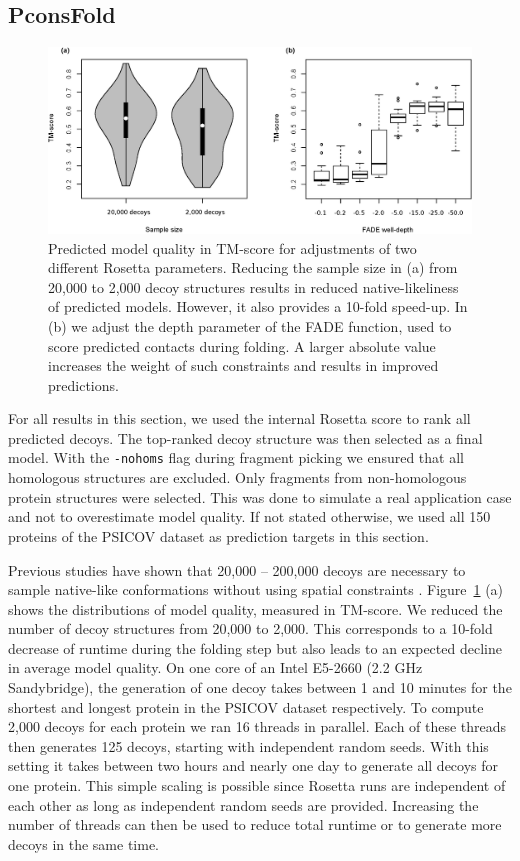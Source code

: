 \documentclass{bioinfo}
\begin{document}
\subsection{PconsFold}
\begin{figure}[!tpb]%
\centerline{\includegraphics[scale=0.7]{figures/rosetta.eps}}
\caption{Predicted model quality in TM-score for adjustments of two
  different Rosetta parameters. Reducing the sample size in (a) from
  20,000 to 2,000 decoy structures results in reduced
  native-likeliness of predicted models. However, it also provides a
  10-fold speed-up. In (b) we adjust the depth parameter of the FADE
  function, used to score predicted contacts during folding. A larger
  absolute value increases the weight of such constraints and results
  in improved predictions.}\label{fig:ros} 
\end{figure}
For all results in this section, we used the internal Rosetta score to
rank all predicted decoys. The top-ranked decoy structure was then
selected as a final model. With the {\tt -nohoms} flag during fragment
picking we ensured that all homologous structures are excluded. Only
fragments from non-homologous protein structures were selected. This
was done to simulate a real application case and not to overestimate
model quality. If not stated otherwise, we used all 150 proteins of
the PSICOV dataset as prediction targets in this section. 

Previous studies have shown that 20,000 -- 200,000 decoys are
necessary to sample native-like conformations without using spatial
constraints \cite[]{Simons10526365}. Figure~\ref{fig:ros} (a) shows the distributions of model quality, measured
in TM-score. We reduced the number of decoy structures from 20,000 to
2,000. This corresponds to a 10-fold decrease of runtime during the
folding step but also leads to an expected decline in average model
quality. On one core of an Intel E5-2660 (2.2 GHz Sandybridge), 
the generation of one decoy takes between 1 and 10 minutes for the 
shortest and longest protein in the PSICOV dataset respectively. To 
compute 2,000 decoys for each protein we ran 16 threads in parallel. 
Each of these threads then generates 125 decoys, starting with 
independent random seeds. With this setting it takes between two 
hours and nearly one day to generate all decoys for one protein. 
This simple scaling is possible since Rosetta runs are independent of each other 
as long as independent random seeds are provided. Increasing the number of 
threads can then be used to reduce total runtime or to 
generate more decoys in the same time. 
\end{document}
